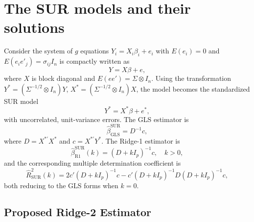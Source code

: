 \documentclass[twoside]{article}
\begin{document}
\section{The SUR models and their solutions}
Consider the system of $g$ equations $Y_i = X_i\beta_i + e_i$ with $E(e_i)=0$ and $E(e_i e'_j)=\sigma_{ij}I_n$ is compactly written as
\begin{equation}
Y = X\beta + e, \label{eq:2}
\end{equation}
where $X$ is block diagonal and $E(ee')=\Sigma\otimes I_n$. 
Using the transformation $Y^* = (\Sigma^{-1/2}\otimes I_n)Y$, $X^* = (\Sigma^{-1/2}\otimes I_n)X$, the model becomes the standardized SUR model
\begin{equation}
Y^* = X^*\beta + e^*, \label{eq:3}
\end{equation}
with uncorrelated, unit-variance errors. 
The GLS estimator is
\begin{equation}
\hat{\beta}^{\text{SUR}}_{\text{GLS}} = D^{-1}c, \label{eq:4}
\end{equation}
where $D = X^{*'}X^{*}$ and $c = X^{*'}Y^{*}$. 
The Ridge-1 estimator is
\begin{equation}
\hat{\beta}^{\text{SUR}}_{\text{R1}}(k) = (D + kI_p)^{-1}c, \quad k>0, \label{eq:5}
\end{equation}
and the corresponding multiple determination coefficient is
\begin{equation}
\hat{R}^{2}_{\text{SUR}}(k) = 2c'(D + kI_p)^{-1}c - c'(D + kI_p)^{-1}D(D + kI_p)^{-1}c, \label{eq:6}
\end{equation}
both reducing to the GLS forms when $k=0$.

\subsection{Proposed Ridge-2 Estimator}
\end{document}
